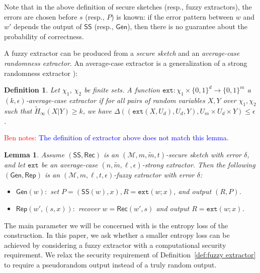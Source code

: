 \documentclass[11pt]{article}
\newcommand{\secref}[1]{\mbox{Section~\ref{#1}}}
\newcommand{\defref}[1]{\mbox{Definition~\ref{#1}}}
\newcommand{\class}[1]{{\ensuremath{\mathsf{#1}}}}
\newcommand{\gen}{\ensuremath{\class{Gen}}\xspace}
\newcommand{\rep}{\ensuremath{\class{Rep}}\xspace}
\newcommand{\sketch}{\ensuremath{\class{SS}}\xspace}
\newcommand{\rec}{\ensuremath{\class{Rec}}\xspace}
\newcommand{\dis}{\ensuremath{\mathsf{dis}}}
\newcommand{\ext}{\ensuremath{\mathtt{ext}}}
\newtheorem{lemma}[theorem]{Lemma}
\newtheorem{definition}[theorem]{Definition}
\newcommand{\authnote}[2]{{\textcolor{red}{\textsf{#1 notes: }\textcolor{blue}{ #2}}\marginpar{\textcolor{red}{\textbf{!!!!!}}}}}
\newcommand{\authnote}[2]{}
\newcommand{\bnote}[1]{{\authnote{Ben}{#1}}}
\newcommand{\lnote}[1]{{\authnote{Leo}{#1}}}
\begin{document}
Note that in the above definition of secure sketches (resp., fuzzy extractors), the errors are chosen before $s$ (resp., $P$) is known: if the error pattern between $w$ and $w'$ depends the output of $\sketch$ (resp., $\gen$), then there is no guarantee about the probability of correctness.


A fuzzy extractor can be produced from a \emph{secure sketch} and an \emph{average-case randomness extractor}. An average-case extractor is a generalization of a strong randomness extractor \cite[Definition 2]{nisan1993randomness}):

\begin{definition}
Let $\chi_1$, $\chi_2$ be finite sets.
A function $\ext: \chi_1\times \{0,1\}^d \rightarrow \{0,1\}^m$ a \emph{$(k, \epsilon)$-average-case extractor} if for all pairs
of random variables $X, Y$ over $\chi_1, \chi_2$ such that
$\tilde{H}_\infty(X|Y) \ge k$, we have $\Delta((\ext(X, U_d), U_d, Y), U_m\times
U_d \times Y) \le \epsilon$.
\end{definition}



\bnote{The definition of extractor above does not match this lemma.}
\begin{lemma}%
\label{lem:fuzzy ext construction}
Assume $(\sketch, \rec)$ is an $(\mathcal{M}, m, \tilde{m}, t)$-secure sketch with error $\delta$, and let $\ext$ be an average-case $(n, \tilde{m}, \ell, \epsilon)$-strong extractor.  Then the following $(\gen, \rep)$ is an $(\mathcal{M}, m, \ell, t, \epsilon)$-fuzzy extractor with error $\delta$:
\begin{itemize}
\item $\gen(w):$ set $P=(\sketch(w), x), R=\ext(w;x)$, and output $(R,P)$.
\item $\rep(w', (s, x)):$ recover $w=\rec(w',s)$ and output $R=\ext(w;x)$.
\end{itemize}
\end{lemma}
The main parameter we will be concerned with is the entropy loss of the construction.  In this paper, we ask whether a smaller entropy loss can be achieved by considering a fuzzy extractor with a computational security requirement.  We relax the security requirement of \defref{def:fuzzy extractor} to require a pseudorandom output instead of a truly random output.
\end{document}
